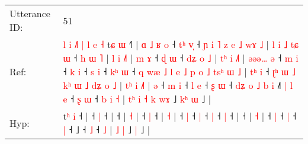 \documentclass[10pt]{article}
\DeclareRobustCommand{\hl}[1]{{\textcolor{red}{#1}}}
\begin{document}
\begin{longtable}{ll}
\midrule
Utterance ID: & 51 \\
Ref: & \hl{l}\hl{ }\hl{i}\hl{ }\hl{˩}\hl{˥}\hl{ }\hl{|}\hl{ }\hl{l}\hl{ }\hl{e}\hl{ }\hl{˧}\hl{ }t\hl{ɕ} \hl{ɯ} ˧\hl{˥} |\hl{ }\hl{ɑ}\hl{ }\hl{˩}\hl{ }\hl{ʁ}\hl{ }\hl{o} ˧\hl{ }\hl{t}\hl{ʰ} \hl{v}\hl{̩} ˧\hl{ }\hl{ɲ}\hl{ }\hl{i}\hl{ }\hl{˥}\hl{ }\hl{z}\hl{ }\hl{e}\hl{ }\hl{˩}\hl{ }\hl{w}\hl{ɤ}\hl{ }\hl{˩} |\hl{ }\hl{l}\hl{ }\hl{i}\hl{ }\hl{˩}\hl{ }\hl{t}\hl{ɕ}\hl{ }\hl{ɯ} ˧\hl{ }\hl{h}\hl{ }\hl{ɯ}\hl{ }\hl{˥} |\hl{ }\hl{l}\hl{ }\hl{i} \hl{˩}\hl{˥} |\hl{ }\hl{m}\hl{ }\hl{ɤ} ˧\hl{ }\hl{ɖ} \hl{ɯ} ˧\hl{ }\hl{d}\hl{ʑ}\hl{ }\hl{o}\hl{ }\hl{˩} |\hl{ }\hl{t}\hl{ʰ}\hl{ }\hl{i} \hl{˩}\hl{˥} |\hl{ }\hl{ə}\hl{ə}\hl{ə}\hl{…}\hl{ }\hl{ə} ˧\hl{ }\hl{m} \hl{i} ˧\hl{ }\hl{k} \hl{i} ˧\hl{ }\hl{s} \hl{i} ˧\hl{ }\hl{k}\hl{ʰ} \hl{ɯ} ˧\hl{ }\hl{q}\hl{ }\hl{w}\hl{æ}\hl{ }\hl{˩}\hl{ }\hl{l}\hl{ }\hl{e}\hl{ }\hl{˩}\hl{ }\hl{p}\hl{ }\hl{o}\hl{ }\hl{˩}\hl{ }\hl{t}\hl{s}\hl{ʰ}\hl{ }\hl{ɯ}\hl{ }\hl{˩} |\hl{ }\hl{t}\hl{ʰ}\hl{ }\hl{i} ˧\hl{ }\hl{ʈ}\hl{ʰ}\hl{ }\hl{ɯ}\hl{ }\hl{˩}\hl{ }\hl{k}\hl{ʰ}\hl{ }\hl{ɯ}\hl{ }\hl{˩}\hl{ }\hl{d}\hl{ʑ}\hl{ }\hl{o}\hl{ }\hl{˩} |\hl{ }\hl{t}\hl{ʰ}\hl{ }\hl{i} \hl{˩}\hl{˥} |\hl{ }\hl{ə} ˧\hl{ }\hl{m} \hl{i} ˧\hl{ }\hl{l} \hl{e} ˧\hl{ }\hl{ʂ} \hl{ɯ} ˧\hl{ }\hl{d}\hl{ʑ}\hl{ }\hl{o}\hl{ }\hl{˩}\hl{ }\hl{b}\hl{ }\hl{i} ˩\hl{˥}\hl{ }\hl{|}\hl{ }\hl{l}\hl{ }\hl{e} ˧\hl{ }\hl{ʂ} \hl{ɯ} ˧\hl{ }\hl{b}\hl{ }\hl{i} \hl{˧} |\hl{ }\hl{t}\hl{ʰ}\hl{ }\hl{i}\hl{ }\hl{˧} \hl{k} \hl{w}\hl{ɤ} ˩\hl{ }\hl{k}\hl{ʰ} \hl{ɯ} ˩ |
 \\
Hyp: & \hl{}\hl{}\hl{}\hl{}\hl{}\hl{}\hl{}\hl{}\hl{}\hl{}\hl{}\hl{}\hl{}\hl{}\hl{}t\hl{ʰ} \hl{i} ˧\hl{} |\hl{}\hl{}\hl{}\hl{}\hl{}\hl{}\hl{}\hl{} ˧\hl{}\hl{}\hl{} \hl{}\hl{|} ˧\hl{}\hl{}\hl{}\hl{}\hl{}\hl{}\hl{}\hl{}\hl{}\hl{}\hl{}\hl{}\hl{}\hl{}\hl{}\hl{}\hl{} |\hl{}\hl{}\hl{}\hl{}\hl{}\hl{}\hl{}\hl{}\hl{}\hl{}\hl{} ˧\hl{}\hl{}\hl{}\hl{}\hl{}\hl{} |\hl{}\hl{}\hl{}\hl{} \hl{}\hl{˧} |\hl{}\hl{}\hl{}\hl{} ˧\hl{}\hl{} \hl{|} ˧\hl{}\hl{}\hl{}\hl{}\hl{}\hl{}\hl{} |\hl{}\hl{}\hl{}\hl{}\hl{} \hl{}\hl{˧} |\hl{}\hl{}\hl{}\hl{}\hl{}\hl{}\hl{} ˧\hl{}\hl{} \hl{|} ˧\hl{}\hl{} \hl{|} ˧\hl{}\hl{} \hl{|} ˧\hl{}\hl{}\hl{} \hl{|} ˧\hl{}\hl{}\hl{}\hl{}\hl{}\hl{}\hl{}\hl{}\hl{}\hl{}\hl{}\hl{}\hl{}\hl{}\hl{}\hl{}\hl{}\hl{}\hl{}\hl{}\hl{}\hl{}\hl{}\hl{}\hl{}\hl{}\hl{} |\hl{}\hl{}\hl{}\hl{}\hl{} ˧\hl{}\hl{}\hl{}\hl{}\hl{}\hl{}\hl{}\hl{}\hl{}\hl{}\hl{}\hl{}\hl{}\hl{}\hl{}\hl{}\hl{}\hl{}\hl{}\hl{}\hl{} |\hl{}\hl{}\hl{}\hl{}\hl{} \hl{}\hl{˧} |\hl{}\hl{} ˧\hl{}\hl{} \hl{|} ˧\hl{}\hl{} \hl{|} ˧\hl{}\hl{} \hl{|} ˧\hl{}\hl{}\hl{}\hl{}\hl{}\hl{}\hl{}\hl{}\hl{}\hl{}\hl{} ˩\hl{}\hl{}\hl{}\hl{}\hl{}\hl{}\hl{} ˧\hl{}\hl{} \hl{˩} ˧\hl{}\hl{}\hl{}\hl{} \hl{˩} |\hl{}\hl{}\hl{}\hl{}\hl{}\hl{}\hl{} \hl{˩} \hl{}\hl{|} ˩\hl{}\hl{}\hl{} \hl{|} ˩ |

\end{longtable}
\end{document}
